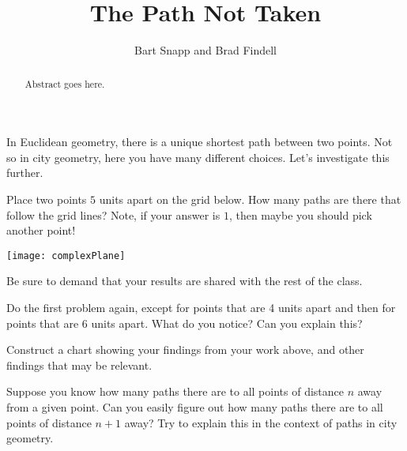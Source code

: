 \documentclass{ximera}
\title{The Path Not Taken}
\author{Bart Snapp and Brad Findell}
\begin{document}
\begin{abstract}
Abstract goes here.  
\end{abstract}
\maketitle


In Euclidean geometry, there is a unique shortest path between two
points. Not so in city geometry, here you have many different
choices. Let's investigate this further.


\begin{problem} 
Place two points $5$ units apart on the grid below. How many paths are
there that follow the grid lines? Note, if your answer is $1$, then
maybe you should pick another point!
\begin{image}
\texttt{[image: complexPlane]}
\end{image}
Be sure to demand that your results are shared with the rest of the
class.
\end{problem}

\begin{problem}
Do the first problem again, except for points that are 4 units apart
and then for points that are 6 units apart. What do you notice? Can
you explain this?
\end{problem}

\begin{problem}
Construct a chart showing your findings from your work above, and
other findings that may be relevant.
\end{problem}

\begin{problem}
Suppose you know how many paths there are to all points of distance
$n$ away from a given point. Can you easily figure out how many paths
there are to all points of distance $n+1$ away? Try to explain this in
the context of paths in city geometry.
\end{problem}
\end{document}

